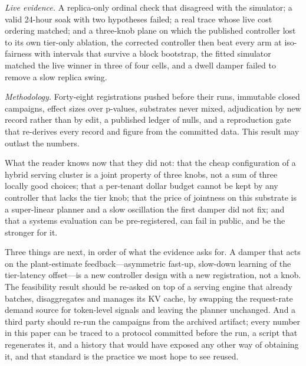 \emph{Live evidence.} A replica-only ordinal check that disagreed with the
simulator; a valid 24-hour soak with two hypotheses failed; a real trace
whose live cost ordering matched; and a three-knob plane on which the
published controller lost to its own tier-only ablation, the corrected
controller then beat every arm at iso-fairness with intervals that survive
a block bootstrap, the fitted simulator matched the live winner in three of
four cells, and a dwell damper failed to remove a slow replica swing.

\emph{Methodology.} Forty-eight registrations pushed before their runs,
immutable closed campaigns, effect sizes over p-values, substrates never
mixed, adjudication by new record rather than by edit, a published ledger
of nulls, and a reproduction gate that re-derives every record and figure
from the committed data. This result may outlast the numbers.

What the reader knows now that they did not: that the cheap configuration
of a hybrid serving cluster is a joint property of three knobs, not a sum
of three locally good choices; that a per-tenant dollar budget cannot be
kept by any controller that lacks the tier knob; that the price of
jointness on this substrate is a super-linear planner and a slow
oscillation the first damper did not fix; and that a systems evaluation
can be pre-registered, can fail in public, and be the stronger for it.

Three things are next, in order of what the evidence asks for. A damper
that acts on the plant-estimate feedback---asymmetric fast-up, slow-down
learning of the tier-latency offset---is a new controller design with a new
registration, not a knob. The feasibility result should be re-asked on top
of a serving engine that already batches, disaggregates and manages its KV
cache, by swapping the request-rate demand source for token-level signals
and leaving the planner unchanged. And a third party should re-run the
campaigns from the archived artifact; every number in this paper can be
traced to a protocol committed before the run, a script that regenerates
it, and a history that would have exposed any other way of obtaining it,
and that standard is the practice we most hope to see reused.
